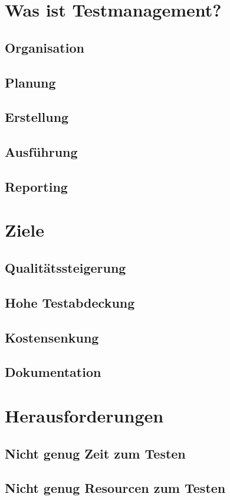 \chapter{Was ist Testmanagement?}
\section{Organisation}
\section{Planung}
\section{Erstellung}
\section{Ausf\"uhrung}
\section{Reporting}

\chapter{Ziele}
\section{Qualit\"atssteigerung}
\section{Hohe Testabdeckung}
\section{Kostensenkung}
\section{Dokumentation}

\chapter{Herausforderungen}
\section{Nicht genug Zeit zum Testen}
\section{Nicht genug Resourcen zum Testen}
